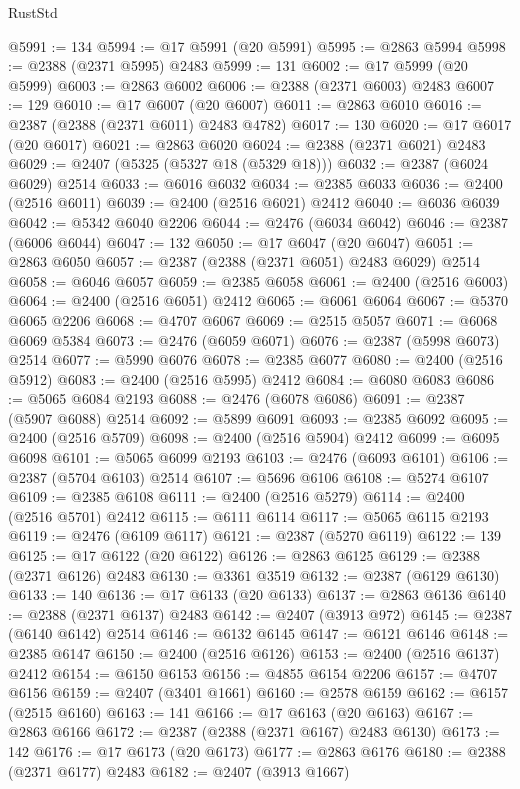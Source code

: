 \begin{lexlean}{RustStd}
\begin{coremodule}
@5991 := 134
@5994 := @17 @5991 (@20 @5991)
@5995 := @2863 @5994
@5998 := @2388 (@2371 @5995) @2483
@5999 := 131
@6002 := @17 @5999 (@20 @5999)
@6003 := @2863 @6002
@6006 := @2388 (@2371 @6003) @2483
@6007 := 129
@6010 := @17 @6007 (@20 @6007)
@6011 := @2863 @6010
@6016 := @2387 (@2388 (@2371 @6011) @2483 @4782)
@6017 := 130
@6020 := @17 @6017 (@20 @6017)
@6021 := @2863 @6020
@6024 := @2388 (@2371 @6021) @2483
@6029 := @2407 (@5325 (@5327 @18 (@5329 @18)))
@6032 := @2387 (@6024 @6029) @2514
@6033 := @6016 @6032
@6034 := @2385 @6033
@6036 := @2400 (@2516 @6011)
@6039 := @2400 (@2516 @6021) @2412
@6040 := @6036 @6039
@6042 := @5342 @6040 @2206
@6044 := @2476 (@6034 @6042)
@6046 := @2387 (@6006 @6044)
@6047 := 132
@6050 := @17 @6047 (@20 @6047)
@6051 := @2863 @6050
@6057 := @2387 (@2388 (@2371 @6051) @2483 @6029) @2514
@6058 := @6046 @6057
@6059 := @2385 @6058
@6061 := @2400 (@2516 @6003)
@6064 := @2400 (@2516 @6051) @2412
@6065 := @6061 @6064
@6067 := @5370 @6065 @2206
@6068 := @4707 @6067
@6069 := @2515 @5057
@6071 := @6068 @6069 @5384
@6073 := @2476 (@6059 @6071)
@6076 := @2387 (@5998 @6073) @2514
@6077 := @5990 @6076
@6078 := @2385 @6077
@6080 := @2400 (@2516 @5912)
@6083 := @2400 (@2516 @5995) @2412
@6084 := @6080 @6083
@6086 := @5065 @6084 @2193
@6088 := @2476 (@6078 @6086)
@6091 := @2387 (@5907 @6088) @2514
@6092 := @5899 @6091
@6093 := @2385 @6092
@6095 := @2400 (@2516 @5709)
@6098 := @2400 (@2516 @5904) @2412
@6099 := @6095 @6098
@6101 := @5065 @6099 @2193
@6103 := @2476 (@6093 @6101)
@6106 := @2387 (@5704 @6103) @2514
@6107 := @5696 @6106
@6108 := @5274 @6107
@6109 := @2385 @6108
@6111 := @2400 (@2516 @5279)
@6114 := @2400 (@2516 @5701) @2412
@6115 := @6111 @6114
@6117 := @5065 @6115 @2193
@6119 := @2476 (@6109 @6117)
@6121 := @2387 (@5270 @6119)
@6122 := 139
@6125 := @17 @6122 (@20 @6122)
@6126 := @2863 @6125
@6129 := @2388 (@2371 @6126) @2483
@6130 := @3361 @3519
@6132 := @2387 (@6129 @6130)
@6133 := 140
@6136 := @17 @6133 (@20 @6133)
@6137 := @2863 @6136
@6140 := @2388 (@2371 @6137) @2483
@6142 := @2407 (@3913 @972)
@6145 := @2387 (@6140 @6142) @2514
@6146 := @6132 @6145
@6147 := @6121 @6146
@6148 := @2385 @6147
@6150 := @2400 (@2516 @6126)
@6153 := @2400 (@2516 @6137) @2412
@6154 := @6150 @6153
@6156 := @4855 @6154 @2206
@6157 := @4707 @6156
@6159 := @2407 (@3401 @1661)
@6160 := @2578 @6159
@6162 := @6157 (@2515 @6160)
@6163 := 141
@6166 := @17 @6163 (@20 @6163)
@6167 := @2863 @6166
@6172 := @2387 (@2388 (@2371 @6167) @2483 @6130)
@6173 := 142
@6176 := @17 @6173 (@20 @6173)
@6177 := @2863 @6176
@6180 := @2388 (@2371 @6177) @2483
@6182 := @2407 (@3913 @1667)

\end{coremodule}
\end{lexlean}
